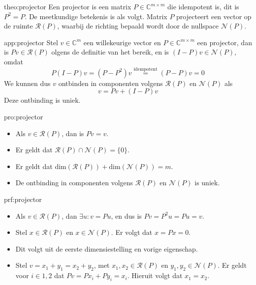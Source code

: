 \begin{theo}[Projector]{theo:projector}
    Een projector is een matrix $P \in \mathbb{C}^{m \times m}$ die idempotent is, dit is $P^2 = P$. De meetkundige betekenis is als volgt. Matrix $P$ projecteert een vector op de ruimte $\mathcal{R}(P)$, waarbij de richting bepaald wordt door de nullspace $\mathcal{N}(P)$. 
\end{theo}

\begin{app}[Projector]{app:projector}
    Stel $v \in \mathbb{C}^m$ een willekeurige vector en $P \in \mathbb{C}^{m \times m}$ een projector, dan is $Pv \in \mathcal{R}(P)$ olgens de definitie van het bereik, en is $(I - P)v \in \mathcal{N}(P)$, omdat 
    \begin{equation*}
        P(I - P)v = (P - P^2)v \overset{\text{idempotent}}{=} (P-P)v = 0
    \end{equation*}
    We kunnen dus $v$ ontbinden in componenten volgens $\mathcal{R}(P)$ en $\mathcal{N}(P)$ als
    \begin{equation*}
        v = Pv + (I - P)v
    \end{equation*}
    Deze ontbinding is uniek.
\end{app}

\begin{pro}[Projector]{pro:projector}
    \begin{itemize}
        \item Als $v \in \mathcal{R}(P)$, dan is $Pv = v$.
        \item Er geldt dat $\mathcal{R}(P) \cap \mathcal{N}(P) = \{0\}$.
        \item Er geldt dat $\text{dim}(\mathcal{R}(P)) + \text{dim}(\mathcal{N}(P)) = m$.
        \item De ontbinding in componenten volgens $\mathcal{R}(P)$ en $\mathcal{N}(P)$ is uniek.
    \end{itemize}
\end{pro}

\begin{prf}[Projector]{prf:projector}
    \begin{itemize}
        \item Als $v \in \mathcal{R}(P)$, dan $\exists u: v = Pu$, en dus is $Pv = P^2u = Pu = v$.
        \item Stel $x \in \mathcal{R}(P)$ en $x \in \mathcal{N}(P)$. Er volgt dat $x = Px = 0$.
        \item Dit volgt uit de eerste dimensiestelling en vorige eigenschap.
        \item Stel $v = x_1 + y_1 = x_2 + y_2$, met $x_1, x_2 \in \mathcal{R}(P)$ en $y_1, y_2 \in \mathcal{N}(P)$. Er geldt voor $i \in {1,2}$ dat $Pv = Px_i + Py_i = x_i$. Hieruit volgt dat $x_1 = x_2$.
    \end{itemize}
\end{prf}


